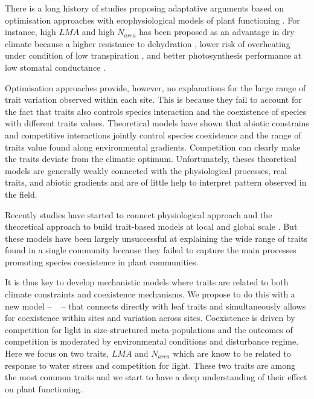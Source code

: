 \documentclass[a4paper,11pt]{article}
\begin{document}
There is a long history of studies
proposing adaptative arguments based on optimisation approaches with
ecophysiological models of plant functioning \citep{Makela-2002}. For instance, high $LMA$ and high $N_{area}$ has been proposed as an advantage in dry climate because
a higher resistance to dehydration
\citep{Wright-2002a,Wright-2002b}, lower risk of overheating
under condition of low transpiration \citep{Leigh-2012}, and better photosynthesis performance at low stomatal conductance \citep{Wright-2003}.

Optimisation approaches provide, however, no explanations for the large range of trait variation observed
within each site. This is because they fail to account for the fact that
traits also controls species interaction and the coexistence of
species with different traits values. 
Theoretical models \citep{Case-2000,Goldberg-2006,Leimar-2008} have shown that abiotic constrains and competitive interactions jointly control species coexistence \citep{Chesson-2018} and the range of traits
value found along environmental gradients. Competition can clearly make the traits deviate from the climatic optimum.  Unfortunately, theses theoretical models are generally weakly connected with the physiological processes, real traits, and abiotic gradients and are of little help to interpret pattern observed in the field. 

Recently studies have started to connect physiological approach
and the theoretical approach to build trait-based models at local \citep{Farrior-2013} and global
scale \citep[see][]{Sakschewski-2015,Scheiter-2013}. But these models have been largely unsuccessful at explaining the wide range of traits found in a single community because they failed to capture the main processes promoting species coexistence in plant communities.

It is thus key to develop mechanistic models where traits are related
to both climate constraints and coexistence mechanisms. We propose to do this with a new model -- \plant\
\citep{Falster-2016,Falster-2017} -- that connects directly with leaf
traits and simultaneously allows for coexistence within sites and
variation across sites. Coexistence is driven by competition for light
in size-structured meta-populations and the outcomes of competition is
moderated by environmental conditions and disturbance regime. Here we focus on two traits, $LMA$ and $N_{area}$ which are know to be related to response to water stress and competition for light. These two traits are among the most common traits and we start to have a deep understanding of their effect on plant functioning. 
\end{document}
